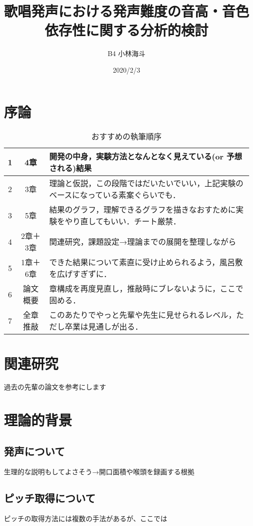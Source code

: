\documentclass[10ptj,a4j,dvipdfmx,uplatex]{jsbook}
\title{歌唱発声における発声難度の音高・音色依存性に関する分析的検討}
\author{B4 小林海斗}
\date{2020/2/3}
\begin{document}

\chapter{序論}

\begin{table}[h]
\caption{おすすめの執筆順序}%
\begin{center}
\begin{tabular}{|c|c|l|} %
\hline
1 & 4章 & 開発の中身，実験方法となんとなく見えている(or 予想される)結果 \\
\hline
2 & 3章 & 理論と仮説，この段階ではだいたいでいい，上記実験のベースになっている素案ぐらいでも． \\
\hline
3 & 5章 & 結果のグラフ，理解できるグラフを描きなおすために実験をやり直してもいい．チート厳禁． \\
\hline
4 & 2章＋3章 & 関連研究，課題設定→理論までの展開を整理しながら \\
\hline
5 & 1章＋6章 & できた結果について素直に受け止められるよう，風呂敷を広げすぎずに． \\
\hline
6 & 論文概要 & 章構成を再度見直し，推敲時にブレないように，ここで固める． \\
\hline
7 & 全章推敲 & このあたりでやっと先輩や先生に見せられるレベル，ただし卒業は見通しが出る． \\
\hline
\end{tabular}
\end{center}
\end{table}

\chapter{関連研究}
過去の先輩の論文を参考にします


\chapter{理論的背景}
\section{発声について}
生理的な説明もしてよさそう→開口面積や喉頭を録画する根拠

\section{ピッチ取得について}
ピッチの取得方法には複数の手法があるが、ここでは
\end{document}
